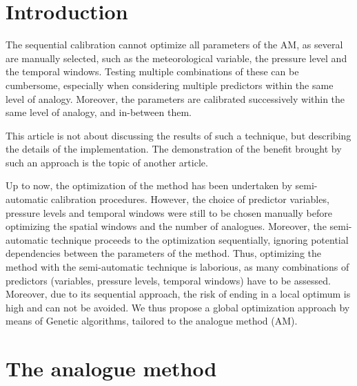 \documentclass[twocol]{ametsoc}
\begin{document}


\section{Introduction}
\label{section_intro}





The sequential calibration cannot optimize all parameters of the AM, as several are manually selected, such as the meteorological variable, the pressure level and the temporal windows. Testing multiple combinations of these can be cumbersome, especially when considering multiple predictors within the same level of analogy. Moreover, the parameters are calibrated successively within the same level of analogy, and in-between them.

 This article is not about discussing the results of such a technique, but describing the details of the implementation. The demonstration of the benefit brought by such an approach is the topic of another article. 





Up to now, the optimization of the method has been undertaken by semi-automatic calibration procedures. However, the choice of predictor variables, pressure levels and temporal windows were still to be chosen manually before optimizing the spatial windows and the number of analogues. Moreover, the semi-automatic technique proceeds to the optimization sequentially, ignoring potential dependencies between the parameters of the method. Thus, optimizing the method with the semi-automatic technique is laborious, as many combinations of predictors (variables, pressure levels, temporal windows) have to be assessed. Moreover, due to its sequential approach, the risk of ending in a local optimum is high and can not be avoided. We thus propose a global optimization approach by means of Genetic algorithms, tailored to the analogue method (AM).



\section{The analogue method}
\label{section_analog_method}
\end{document}
